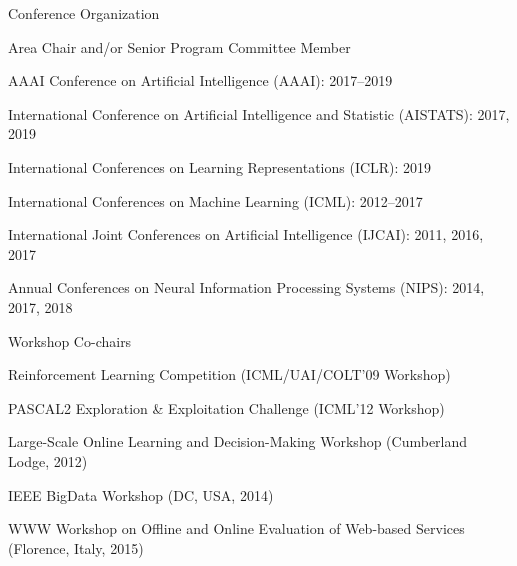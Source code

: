 \documentclass[10pt,twoside,letterpaper]{article}
\newcommand{\negitemspace}{\vspace{1mm}}
\begin{document}
\begin{compactitem}

\item{Conference Organization} \negitemspace

\begin{compactitem}

\item{Area Chair and/or Senior Program Committee Member}

\begin{compactitem}

\item{AAAI Conference on Artificial Intelligence (AAAI): 2017--2019}

\item{International Conference on Artificial Intelligence and Statistic (AISTATS): 2017, 2019}

\item{International Conferences on Learning Representations (ICLR): 2019}

\item{International Conferences on Machine Learning (ICML): 2012--2017}

\item{International Joint Conferences on Artificial Intelligence (IJCAI): 2011, 2016, 2017}

\item{Annual Conferences on Neural Information Processing Systems (NIPS): 2014, 2017, 2018}

\end{compactitem}

\item{Workshop Co-chairs}

\begin{compactitem}

\item{Reinforcement Learning Competition
(ICML/UAI/COLT'09 Workshop)}

\item{PASCAL2 Exploration \& Exploitation Challenge (ICML'12 Workshop)}

\item{Large-Scale Online Learning and Decision-Making Workshop (Cumberland Lodge, 2012)}

\item{IEEE BigData Workshop (DC, USA, 2014)}

\item{WWW Workshop on Offline and Online Evaluation of Web-based Services (Florence, Italy, 2015)}


\end{compactitem}
\end{compactitem}
\end{compactitem}
\end{document}
